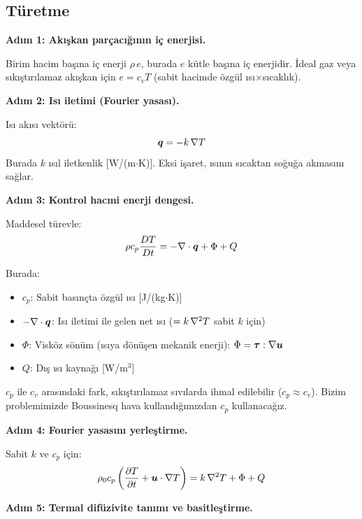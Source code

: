 \subsection{Türetme}

\textbf{Adım 1: Akışkan parçacığının iç enerjisi.}

Birim hacim başına iç enerji $\rho\,e$, burada $e$ kütle başına iç enerjidir. İdeal gaz veya sıkıştırılamaz akışkan için $e = c_v T$ (sabit hacimde özgül ısı$\times$sıcaklık).

\textbf{Adım 2: Isı iletimi (Fourier yasası).}

Isı akısı vektörü:
\begin{equation}
    \bm{q} = -k\,\nabla T
    \label{eq:fourier}
\end{equation}
Burada $k$ ısıl iletkenlik [W/(m$\cdot$K)]. Eksi işaret, ısının sıcaktan soğuğa akmasını sağlar.

\textbf{Adım 3: Kontrol hacmi enerji dengesi.}

Maddesel türevle:
\begin{equation}
    \rho c_p \frac{D T}{Dt} = -\nabla \cdot\bm{q} + \Phi + Q
\end{equation}

Burada:
\begin{itemize}
    \item $c_p$: Sabit basınçta özgül ısı [J/(kg$\cdot$K)]
    \item $-\nabla \cdot\bm{q}$: Isı iletimi ile gelen net ısı ($= k\,\nabla^2 T$ sabit $k$ için)
    \item $\Phi$: Visköz sönüm (ısıya dönüşen mekanik enerji): $\Phi = \bm{\mathsf{\tau}}:\nabla\bm{u}$
    \item $Q$: Dış ısı kaynağı [W/m$^3$]
\end{itemize}

\begin{remark}
$c_p$ ile $c_v$ arasındaki fark, sıkıştırılamaz sıvılarda ihmal edilebilir ($c_p \approx c_v$). Bizim problemimizde Boussinesq hava kullandığımızdan $c_p$ kullanacağız.
\end{remark}

\textbf{Adım 4: Fourier yasasını yerleştirme.}

Sabit $k$ ve $c_p$ için:
\begin{equation}
    \rho_0 c_p \left(\frac{\partial T}{\partial t} + \bm{u}\cdot\nabla T\right) = k\,\nabla^2 T + \Phi + Q
\end{equation}

\textbf{Adım 5: Termal difüzivite tanımı ve basitleştirme.}

